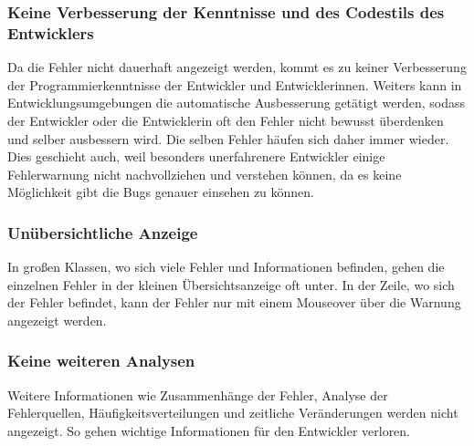 \subsubsection{Keine Verbesserung der Kenntnisse und des Codestils des Entwicklers} 
Da die Fehler nicht dauerhaft angezeigt werden, kommt es zu keiner Verbesserung der Programmierkenntnisse der Entwickler und Entwicklerinnen. Weiters kann in Entwicklungsumgebungen die automatische Ausbesserung getätigt werden, sodass der Entwickler oder die Entwicklerin oft den Fehler nicht bewusst überdenken und selber ausbessern wird. 
Die selben Fehler häufen sich daher immer wieder. Dies geschieht auch, weil besonders unerfahrenere Entwickler einige Fehlerwarnung nicht nachvollziehen und verstehen können, da es keine Möglichkeit gibt die Bugs genauer einsehen zu können. 

\subsubsection{Unübersichtliche Anzeige} 
In großen Klassen, wo sich viele Fehler und Informationen befinden, gehen die einzelnen Fehler in der kleinen Übersichtsanzeige oft unter. In der Zeile, wo sich der Fehler befindet, kann der Fehler nur mit einem Mouseover über die Warnung angezeigt werden. 

\subsubsection{Keine weiteren Analysen}
Weitere Informationen wie Zusammenhänge der Fehler, Analyse der Fehlerquellen, Häufigkeitsverteilungen und zeitliche Veränderungen werden nicht angezeigt. So gehen wichtige Informationen für den Entwickler verloren.